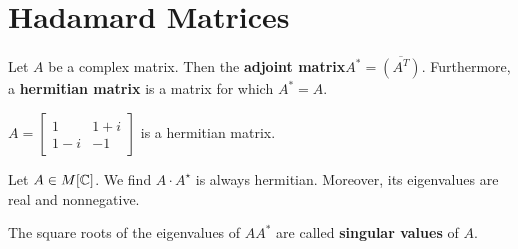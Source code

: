 \section{Hadamard Matrices}
Let \(A\) be a complex matrix. Then the \textbf{adjoint matrix}\(A^{*} = \overline{\left( A^{T} \right) }\). Furthermore, a \textbf{hermitian matrix} is a matrix for which \(A^{*} = A\).
\begin{example}
	\(A = \begin{bmatrix} 1 & 1+ i \\
	1 - i & -1
\end{bmatrix} \) is a hermitian matrix.
\end{example}
Let \(A \in M[\mathbb{C}]\). We find \(A\cdot A^{\star}\) is always hermitian. Moreover, its eigenvalues are real and nonnegative.
\begin{definition}
	The square roots of the eigenvalues  of \(A A^{*}\) are called \textbf{singular values} of \(A\).
\end{definition}
